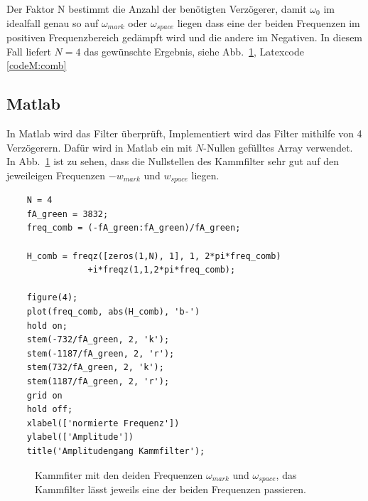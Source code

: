 \documentclass{article}
\begin{document}
Der Faktor N bestimmt die Anzahl der benötigten Verzögerer, damit $\omega_0$ im idealfall genau so auf $\omega_{mark}$ oder $\omega_{space}$ liegen dass eine der beiden 
Frequenzen im positiven Frequenzbereich gedämpft wird und die andere im Negativen. In diesem Fall liefert $N = 4$ das gewünschte Ergebnis, siehe Abb.~\ref{fig:comb}, Latexcode \ref{codeM:comb}

\subsection{Matlab}
In Matlab wird das Filter überprüft, Implementiert wird das Filter mithilfe von 4 Verzögerern.
Dafür wird in Matlab ein mit $N$-Nullen gefülltes Array verwendet. In Abb.~\ref{fig:comb} ist zu sehen,
dass die Nullstellen des Kammfilter sehr gut auf den jeweileigen Frequenzen $- w_{mark}$ und $w_{space}$ liegen.

\begin{listing}
    \label{codeM:comb}
    \caption{In Matlab wird Überprüft ob die Berechnung des $N$ korrekt sind, indem das Filter mit den Frequenzen
    $w_{mark}$ und $w_{space}$ geplottet wird, siehe Abb.~\ref{fig:comb}. Es wird kontrolliert ob die Nullstellen in den richten Punkten auf der Frequenzachse liegen.}
\begin{verbatim}
    N = 4
    fA_green = 3832;
    freq_comb = (-fA_green:fA_green)/fA_green;
    
    H_comb = freqz([zeros(1,N), 1], 1, 2*pi*freq_comb)
                +i*freqz(1,1,2*pi*freq_comb);
    
    figure(4);
    plot(freq_comb, abs(H_comb), 'b-')
    hold on;
    stem(-732/fA_green, 2, 'k');
    stem(-1187/fA_green, 2, 'r');
    stem(732/fA_green, 2, 'k');
    stem(1187/fA_green, 2, 'r');
    grid on
    hold off;
    xlabel(['normierte Frequenz'])
    ylabel(['Amplitude'])
    title('Amplitudengang Kammfilter');
\end{verbatim}
\end{listing}

\begin{figure}[!h]
    \label{fig:comb}
    \centering
    \def\svgscale{0.3}
    \def\svgwidth{0.8\columnwidth}
    
    \caption{Kammfiter mit den deiden Frequenzen $\omega_{mark}$ und $\omega_{space}$, das Kammfilter lässt jeweils eine der beiden Frequenzen passieren.}
\end{figure}
\end{document}
